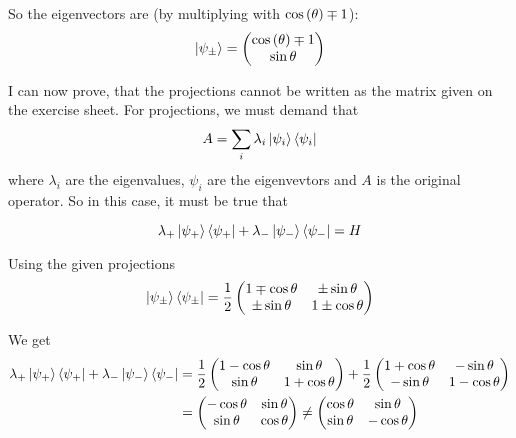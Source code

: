 \documentclass[a4paper,german,12pt,smallheadings]{scrartcl}
\begin{document}
\begin{enumerate}[a)]
    So the eigenvectors are (by multiplying with $\cos\del\theta \mp 1$):
    \begin{equation*}
    \ket{\psi_\pm} = \begin{pmatrix} \cos\del\theta \mp 1 \\ \sin\theta \end{pmatrix}
    \end{equation*}

    I can now prove, that the projections cannot be written as the matrix given
    on the exercise sheet. For projections, we must demand that
    \begin{align*}
      A = \sum_i \lambda_i \ket{\psi_i}\bra{\psi_i}
    \end{align*}
    where $\lambda_i$ are the eigenvalues, $\psi_i$ are the eigenvevtors and
    $A$ is the original operator. So in this case, it must be true that

    \begin{equation*}
      \lambda_+ \ket{\psi_+} \bra{\psi_+} + \lambda_- \ket{\psi_-} \bra{\psi_-} = H
    \end{equation*}

    Using the given projections
    \begin{equation*}
      \ket{\psi_\pm} \bra{\psi_\pm} = \frac{1}{2} \begin{pmatrix}
        1 \mp \cos \theta & \pm \sin \theta \\
        \pm \sin \theta & 1 \pm \cos \theta
      \end{pmatrix}
    \end{equation*}

    We get
    \begin{align*}
      \lambda_+ \ket{\psi_+} \bra{\psi_+} + \lambda_- \ket{\psi_-} \bra{\psi_-} &=
      \frac{1}{2} \begin{pmatrix}
        1 - \cos \theta &  \sin \theta \\
         \sin \theta & 1 + \cos \theta
      \end{pmatrix}
      +
      \frac{1}{2} \begin{pmatrix}
        1 + \cos \theta &  -\sin \theta \\
         -\sin \theta & 1 - \cos \theta
      \end{pmatrix}\\
      &=
      \begin{pmatrix}
        -\cos \theta &  \sin \theta \\
         \sin \theta &  \cos \theta
      \end{pmatrix}
      \neq
      \begin{pmatrix}
        \cos \theta &  \sin \theta \\
         \sin \theta &  -\cos \theta
      \end{pmatrix}
    \end{align*}


\end{enumerate}
\end{document}

